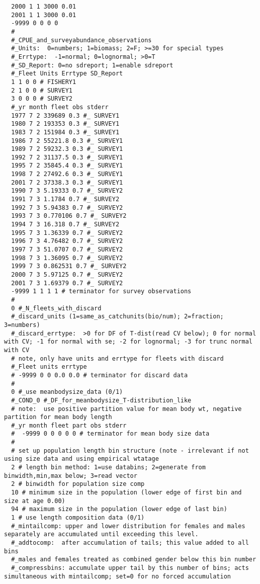 \begin{landscape}
{\begin{verbatim}
  2000 1 1 3000 0.01
  2001 1 1 3000 0.01
  -9999 0 0 0 0
  #
  #_CPUE_and_surveyabundance_observations
  #_Units:  0=numbers; 1=biomass; 2=F; >=30 for special types
  #_Errtype:  -1=normal; 0=lognormal; >0=T
  #_SD_Report: 0=no sdreport; 1=enable sdreport
  #_Fleet Units Errtype SD_Report
  1 1 0 0 # FISHERY1
  2 1 0 0 # SURVEY1
  3 0 0 0 # SURVEY2
  #_yr month fleet obs stderr
  1977 7 2 339689 0.3 #_ SURVEY1
  1980 7 2 193353 0.3 #_ SURVEY1
  1983 7 2 151984 0.3 #_ SURVEY1
  1986 7 2 55221.8 0.3 #_ SURVEY1
  1989 7 2 59232.3 0.3 #_ SURVEY1
  1992 7 2 31137.5 0.3 #_ SURVEY1
  1995 7 2 35845.4 0.3 #_ SURVEY1
  1998 7 2 27492.6 0.3 #_ SURVEY1
  2001 7 2 37338.3 0.3 #_ SURVEY1
  1990 7 3 5.19333 0.7 #_ SURVEY2
  1991 7 3 1.1784 0.7 #_ SURVEY2
  1992 7 3 5.94383 0.7 #_ SURVEY2
  1993 7 3 0.770106 0.7 #_ SURVEY2
  1994 7 3 16.318 0.7 #_ SURVEY2
  1995 7 3 1.36339 0.7 #_ SURVEY2
  1996 7 3 4.76482 0.7 #_ SURVEY2
  1997 7 3 51.0707 0.7 #_ SURVEY2
  1998 7 3 1.36095 0.7 #_ SURVEY2
  1999 7 3 0.862531 0.7 #_ SURVEY2
  2000 7 3 5.97125 0.7 #_ SURVEY2
  2001 7 3 1.69379 0.7 #_ SURVEY2
  -9999 1 1 1 1 # terminator for survey observations 
  #
  0 #_N_fleets_with_discard
  #_discard_units (1=same_as_catchunits(bio/num); 2=fraction; 3=numbers)
  #_discard_errtype:  >0 for DF of T-dist(read CV below); 0 for normal with CV; -1 for normal with se; -2 for lognormal; -3 for trunc normal with CV
  # note, only have units and errtype for fleets with discard 
  #_Fleet units errtype
  # -9999 0 0 0.0 0.0 # terminator for discard data 
  #
  0 #_use meanbodysize_data (0/1)
  #_COND_0 #_DF_for_meanbodysize_T-distribution_like
  # note:  use positive partition value for mean body wt, negative partition for mean body length 
  #_yr month fleet part obs stderr
  #  -9999 0 0 0 0 0 # terminator for mean body size data 
  #
  # set up population length bin structure (note - irrelevant if not using size data and using empirical wtatage
  2 # length bin method: 1=use databins; 2=generate from binwidth,min,max below; 3=read vector
  2 # binwidth for population size comp 
  10 # minimum size in the population (lower edge of first bin and size at age 0.00) 
  94 # maximum size in the population (lower edge of last bin) 
  1 # use length composition data (0/1)
  #_mintailcomp: upper and lower distribution for females and males separately are accumulated until exceeding this level.
  #_addtocomp:  after accumulation of tails; this value added to all bins
  #_males and females treated as combined gender below this bin number 
  #_compressbins: accumulate upper tail by this number of bins; acts simultaneous with mintailcomp; set=0 for no forced accumulation

\end{verbatim}}
\end{landscape}
